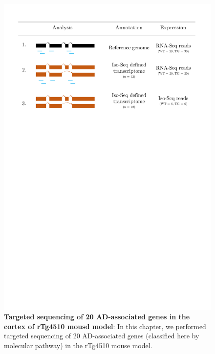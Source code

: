 \begin{figure}[htp]
	\centering
	\includegraphics[page=5,trim={1cm 32cm 1cm 0cm},clip,scale = 0.45]{Figures/Tg4510_diff_figures.pdf}
	\captionsetup{width=0.95\textwidth}
	\caption[Targeted sequencing of 20 AD-associated genes in the cortex of rTg4510 mouse model]%
	{\textbf{Targeted sequencing of 20 AD-associated genes in the cortex of rTg4510 mousd model}: In this chapter, we performed targeted sequencing of 20 AD-associated genes (classified here by molecular pathway) in the rTg4510 mouse model.}
	\label{fig:targeted_genes}
\end{figure}


